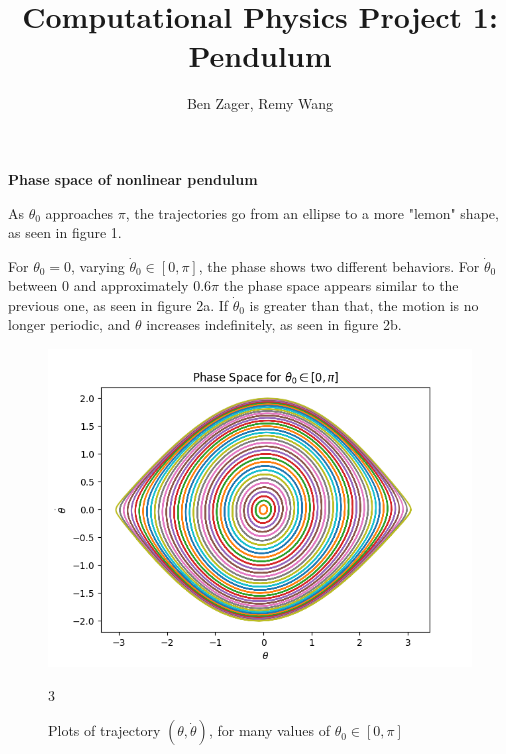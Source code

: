 \documentclass[12pt]{article}
\newenvironment{problem}[2][]{\begin{trivlist}
\item[\hskip \labelsep {\bfseries #1}\hskip \labelsep {\bfseries #2.}]}{\end{trivlist}}
\begin{document}
  
\title{Computational Physics Project 1: Pendulum}
\author{Ben Zager, Remy Wang}
\maketitle
 
\begin{problem}{1}
	\textbf{Phase space of nonlinear pendulum}

	As $\theta_{0}$ approaches $\pi$, the trajectories go from an ellipse to a more "lemon" shape, as seen in figure 1.

	For $\theta_{0} = 0$, varying $\dot{\theta}_{0} \in [0,\pi]$, the phase shows two different behaviors.  For $\dot{\theta}_{0}$ between 0 and approximately $0.6\pi$ the phase space appears similar to the previous one, as seen in figure 2a.  If $\dot{\theta}_{0}$ is greater than that, the motion is no longer periodic, and $\theta$ increases indefinitely, as seen in figure 2b.

\begin{figure}[ht!]
	\centering
	\includegraphics[scale=0.6]{../figures/phaseSpace.png}
	\caption{Plots of trajectory $(\theta,\dot{\theta})$, for many values of $\theta_{0} \in [0,\pi]$}
	3\label{phase}
\end{figure}


\end{problem}
\end{document}
